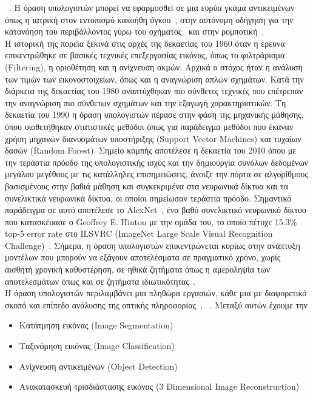 \documentclass[12pt]{article}
\numberwithin{equation}{section}
\begin{document}
\noindent ~\cite{Gao_2020}. Η όραση υπολογιστών μπορεί να εφαρμοσθεί σε μια ευρύα γκάμα αντικειμένων όπως η ιατρική στον εντοπισμό κακοήθη όγκου~\cite{Esteva2021}, στην αυτόνομη οδήγηση για την κατανόηση του περιβάλλοντος γύρω του οχήματος~\cite{unknown1} και στην ρομποτική~\cite{article1}. \\

Η ιστορική της πορεία ξεκινά στις αρχές της δεκαετίας του 1960 όταν η έρευνα επικεντρώθηκε σε βασικές τεχνικές επεξεργασίας εικόνας, όπως το φιλτράρισμα (Filtering), η οριοθέτηση και η ανίχνευση ακμών. Αρχικά ο στόχος ήταν η ανάλυση των τιμών των εικονοστοιχείων, όπως και η αναγνώριση απλών σχημάτων. Κατά την διάρκεια της δεκαετίας του 1980 αναπτύχθηκαν πιο σύνθετες τεχνικές που επέτρεπαν την αναγνώριση πιο σύνθετων σχημάτων και την εξαγωγή χαρακτηριστικών. Τη δεκαετία του 1990 η όραση υπολογιστών πέρασε στην φάση της μηχανικής μάθησης, όπου υιοθετήθηκαν στατιστικές μεθόδοι όπως για παράδειγμα μεθόδοι που έκαναν χρήση μηχανών διανυσμάτων υποστήριξης (Support Vector Machines) και τυχαίων δασών (Random Forest). Σημείο καμπής αποτέλεσε η δεκαετία του 2010 όπου με την τεράστια πρόοδο της υπολογιστικής ισχύς και την δημιουργία συνόλων δεδομένων μεγάλου μεγέθους με τις κατάλληλες επισημειώσεις, άνοιξε την πόρτα σε αλγορίθμους βασισμένους στην βαθιά μάθηση και συγκεκριμένα στα νευρωνικά δίκτυα και τα συνελικτικά νευρωνικά δίκτυα, οι οποίοι σημείωσαν τεράστια πρόοδο. Σημαντικό παράδειγμα σε αυτό αποτέλεσε το AlexNet~\cite{NIPS2012_c399862d}, ένα βαθύ συνελικτικό νευρωνικό δίκτυο που κατασκέυασε ο Geoffrey E. Hinton με την ομάδα του, το οποίο πέτυχε 15.3\% top-5 error rate στο ILSVRC (ImageNet
Large Scale Visual Recognition Challenge)~\cite{russakovsky2015imagenetlargescalevisual}. Σήμερα, η όραση υπολογιστών επικεντρώνεται κυρίως στην ανάπτυξη μοντέλων που μπορούν να εξάγουν αποτελέσματα σε πραγματικό χρόνο, χωρίς αισθητή χρονική καθυστέρηση, σε ηθικά ζητήματα όπως η αμεροληψία των αποτελεσμάτων όπως και σε ζητήματα ιδιωτικότητας~\cite{article2}. \\

Η όραση υπολογιστών περιλαμβάνει μια πληθώρα εργασιών, κάθε μια με διαφορετικό σκοπό και επίπεδο ανάλυσης της οπτικής πληροφορίας~\cite{boesch2024computer}, ~\cite{zhou2024comprehensive}. Μεταξύ αυτών έχουμε την

\begin{itemize}
    \item Κατάτμηση εικόνας (Image Segmentation)
    \item Ταξινόμηση εικόνας (Image Classification)
    \item Ανίχνευση αντικειμένων (Object Detection)
    \item Ανακατασκευή τρισδιάστασης εικόνας (3 Dimensional Image Reconstruction)
\end{itemize}
\end{document}
